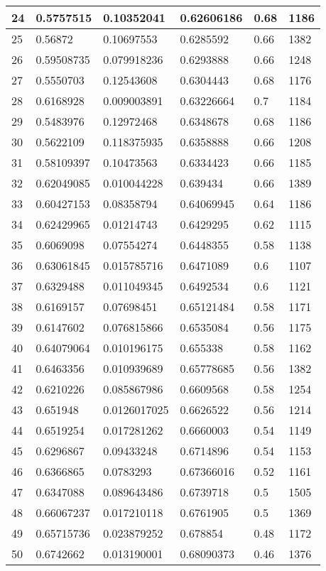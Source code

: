 \begin{longtable}{|l|l|l|l|l|l|}
24 & 0.5757515 & 0.10352041 & 0.62606186 & 0.68 & 1186 \\ \hline 
25 & 0.56872 & 0.10697553 & 0.6285592 & 0.66 & 1382 \\ \hline 
26 & 0.59508735 & 0.079918236 & 0.6293888 & 0.66 & 1248 \\ \hline 
27 & 0.5550703 & 0.12543608 & 0.6304443 & 0.68 & 1176 \\ \hline 
28 & 0.6168928 & 0.009003891 & 0.63226664 & 0.7 & 1184 \\ \hline 
29 & 0.5483976 & 0.12972468 & 0.6348678 & 0.68 & 1186 \\ \hline 
30 & 0.5622109 & 0.118375935 & 0.6358888 & 0.66 & 1208 \\ \hline 
31 & 0.58109397 & 0.10473563 & 0.6334423 & 0.66 & 1185 \\ \hline 
32 & 0.62049085 & 0.010044228 & 0.639434 & 0.66 & 1389 \\ \hline 
33 & 0.60427153 & 0.08358794 & 0.64069945 & 0.64 & 1186 \\ \hline 
34 & 0.62429965 & 0.01214743 & 0.6429295 & 0.62 & 1115 \\ \hline 
35 & 0.6069098 & 0.07554274 & 0.6448355 & 0.58 & 1138 \\ \hline 
36 & 0.63061845 & 0.015785716 & 0.6471089 & 0.6 & 1107 \\ \hline 
37 & 0.6329488 & 0.011049345 & 0.6492534 & 0.6 & 1121 \\ \hline 
38 & 0.6169157 & 0.07698451 & 0.65121484 & 0.58 & 1171 \\ \hline 
39 & 0.6147602 & 0.076815866 & 0.6535084 & 0.56 & 1175 \\ \hline 
40 & 0.64079064 & 0.010196175 & 0.655338 & 0.58 & 1162 \\ \hline 
41 & 0.6463356 & 0.010939689 & 0.65778685 & 0.56 & 1382 \\ \hline 
42 & 0.6210226 & 0.085867986 & 0.6609568 & 0.58 & 1254 \\ \hline 
43 & 0.651948 & 0.0126017025 & 0.6626522 & 0.56 & 1214 \\ \hline 
44 & 0.6519254 & 0.017281262 & 0.6660003 & 0.54 & 1149 \\ \hline 
45 & 0.6296867 & 0.09433248 & 0.6714896 & 0.54 & 1153 \\ \hline 
46 & 0.6366865 & 0.0783293 & 0.67366016 & 0.52 & 1161 \\ \hline 
47 & 0.6347088 & 0.089643486 & 0.6739718 & 0.5 & 1505 \\ \hline 
48 & 0.66067237 & 0.017210118 & 0.6761905 & 0.5 & 1369 \\ \hline 
49 & 0.65715736 & 0.023879252 & 0.678854 & 0.48 & 1172 \\ \hline 
50 & 0.6742662 & 0.013190001 & 0.68090373 & 0.46 & 1376 \\ \hline 
\end{longtable}